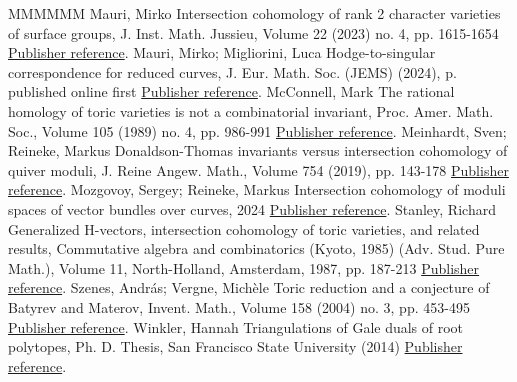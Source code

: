 \begin{thebibliography}{MMMMMM}
 Mauri, Mirko Intersection cohomology of rank 2 character varieties of surface groups, J. Inst. Math. Jussieu, Volume 22 (2023) no. 4, pp. 1615-1654 \href{https://alco.centre-mersenne.org/articles/10.5802/alco.417/#Mauri}{Publisher reference}.
 Mauri, Mirko; Migliorini, Luca Hodge-to-singular correspondence for reduced curves, J. Eur. Math. Soc. (JEMS) (2024), p. published online first \href{https://alco.centre-mersenne.org/articles/10.5802/alco.417/#MM}{Publisher reference}.
 McConnell, Mark The rational homology of toric varieties is not a combinatorial invariant, Proc. Amer. Math. Soc., Volume 105 (1989) no. 4, pp. 986-991 \href{https://alco.centre-mersenne.org/articles/10.5802/alco.417/#McConnel}{Publisher reference}.
 Meinhardt, Sven; Reineke, Markus Donaldson-Thomas invariants versus intersection cohomology of quiver moduli, J. Reine Angew. Math., Volume 754 (2019), pp. 143-178 \href{https://alco.centre-mersenne.org/articles/10.5802/alco.417/#MeinRein}{Publisher reference}.
 Mozgovoy, Sergey; Reineke, Markus Intersection cohomology of moduli spaces of vector bundles over curves, 2024 \href{https://alco.centre-mersenne.org/articles/10.5802/alco.417/#MozgovoyRein}{Publisher reference}.
 Stanley, Richard Generalized H-vectors, intersection cohomology of toric varieties, and related results, Commutative algebra and combinatorics (Kyoto, 1985) (Adv. Stud. Pure Math.), Volume 11, North-Holland, Amsterdam, 1987, pp. 187-213 \href{https://alco.centre-mersenne.org/articles/10.5802/alco.417/#Stanley}{Publisher reference}.
 Szenes, András; Vergne, Michèle Toric reduction and a conjecture of Batyrev and Materov, Invent. Math., Volume 158 (2004) no. 3, pp. 453-495 \href{https://alco.centre-mersenne.org/articles/10.5802/alco.417/#SzV}{Publisher reference}.
 Winkler, Hannah Triangulations of Gale duals of root polytopes, Ph. D. Thesis, San Francisco State University (2014) \href{https://alco.centre-mersenne.org/articles/10.5802/alco.417/#HW}{Publisher reference}.
\end{thebibliography}
